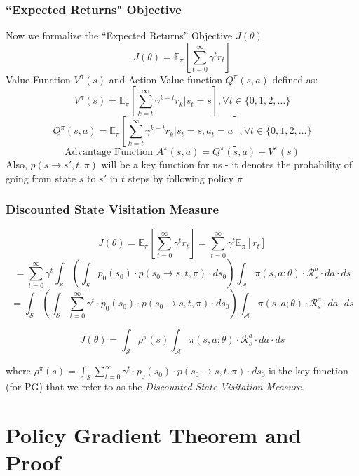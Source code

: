 \documentclass[handout]{beamer}
\begin{document}
\begin{frame}
\frametitle{``Expected Returns" Objective}
\pause
Now we formalize the ``Expected Returns'' Objective $J(\theta)$
$$J(\theta) = \mathbb{E}_{\pi}[\sum_{t=0}^\infty \gamma^t r_t]$$
\pause
Value Function $V^{\pi}(s)$ and Action Value function $Q^{\pi}(s,a)$ defined as:
$$V^{\pi}(s) = \mathbb{E}_{\pi}[\sum_{k=t}^\infty \gamma^{k-t} r_k|s_t=s], \forall t \in \{0, 1, 2, \ldots\}$$
$$Q^{\pi}(s,a) = \mathbb{E}_{\pi}[\sum_{k=t}^\infty \gamma^{k-t} r_k|s_t=s, a_t=a], \forall t \in \{0, 1, 2, \ldots\}$$
\pause
$$\mbox{Advantage Function } A^{\pi}(s,a) = Q^{\pi}(s,a) - V^{\pi}(s)$$
\pause
Also, $p(s \rightarrow s', t, \pi)$ will be a key function for us - it denotes the probability of going from state $s$ to $s'$ in $t$ steps by following policy $\pi$
\end{frame}

\begin{frame}
\frametitle{Discounted State Visitation Measure}
\pause
$$J(\theta) = \mathbb{E}_{\pi}[\sum_{t=0}^\infty \gamma^t r_t] = \sum_{t=0}^\infty \gamma^t \mathbb{E}_{\pi}[r_t]$$
\pause
$$ = \sum_{t=0}^\infty \gamma^t \int_{\mathcal{S}} (\int_{\mathcal{S}}  p_0(s_0) \cdot p(s_0 \rightarrow s, t, \pi) \cdot ds_0) \int_{\mathcal{A}} \pi(s,a; \theta) \cdot \mathcal{R}_s^a \cdot da \cdot ds$$
\pause
$$ =  \int_{\mathcal{S}} (\int_{\mathcal{S}}  \sum_{t=0}^\infty \gamma^t \cdot p_0(s_0) \cdot p(s_0 \rightarrow s, t, \pi) \cdot ds_0) \int_{\mathcal{A}} \pi(s,a; \theta) \cdot \mathcal{R}_s^a \cdot da \cdot ds$$
\pause
\begin{definition}
$$J(\theta) =  \int_{\mathcal{S}} \rho^{\pi}(s) \int_{\mathcal{A}} \pi(s,a; \theta) \cdot \mathcal{R}_s^a \cdot da \cdot ds$$
\end{definition}
\pause
where $\rho^{\pi}(s) = \int_{\mathcal{S}}  \sum_{t=0}^\infty \gamma^t \cdot p_0(s_0) \cdot p(s_0 \rightarrow s, t, \pi) \cdot ds_0$ is the key function (for PG) that we refer to as the {\em Discounted State Visitation Measure}.
\end{frame}

\section{Policy Gradient Theorem and Proof}
\end{document}
